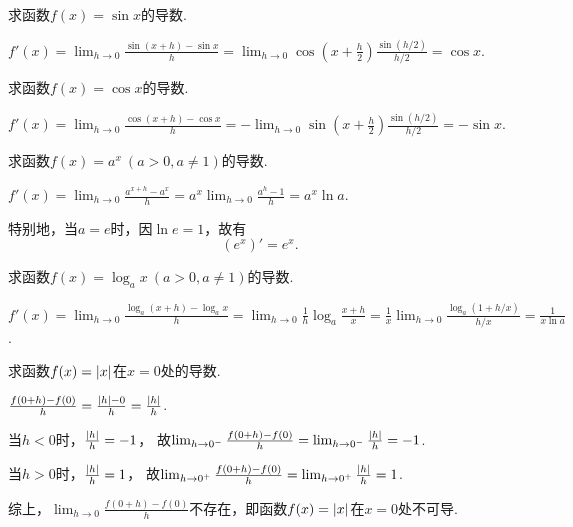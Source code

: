 \begin{example}%
求函数\(f(x) = \sin x\)的导数.
\begin{solution}
\(f'(x) = \lim_{h\to0} \frac{\sin(x+h)-\sin x}{h}
= \lim_{h\to0} \cos(x+\frac{h}{2}) \frac{\sin(h/2)}{h/2}
= \cos x\).
\end{solution}
\end{example}

\begin{example}%
求函数\(f(x) = \cos x\)的导数.
\begin{solution}
\(f'(x) = \lim_{h\to0} \frac{\cos(x+h)-\cos x}{h}
= - \lim_{h\to0} \sin\left(x+\frac{h}2\right) \frac{\sin(h/2)}{h/2}
= - \sin x\).
\end{solution}
\end{example}

\begin{example}%
求函数\(f(x) = a^x\ (a>0,a\neq1)\)的导数.
\begin{solution}
\(f'(x)
= \lim_{h\to0}\frac{a^{x+h}-a^x}{h}
= a^x \lim_{h\to0}\frac{a^h-1}{h}
= a^x \ln a\).
\end{solution}
\end{example}
\begin{remark}
特别地，当\(a=e\)时，因\(\ln e = 1\)，故有\[
	(e^x)' = e^x.
\]
\end{remark}

\begin{example}%
求函数\(f(x) = \log_a x\ (a>0,a\neq1)\)的导数.
\begin{solution}
\(f'(x)
= \lim_{h\to0}\frac{\log_a(x+h)-\log_a x}{h}
= \lim_{h\to0}{\frac{1}{h} \log_a\frac{x+h}{x}}
= \frac{1}{x} \lim_{h\to0}\frac{\log_a(1+h/x)}{h/x}
= \frac{1}{x \ln a}\).
\end{solution}
\end{example}

\begin{example}
求函数\(f(x) = \abs{x}\)在\(x=0\)处的导数.
\begin{solution}
\(\frac{f(0+h)-f(0)}{h} = \frac{\abs{h}-0}{h} = \frac{\abs{h}}{h}\).

当\(h < 0\)时，\(\frac{\abs{h}}{h} = -1\)，
故\(\lim_{h\to0^-}\frac{f(0+h)-f(0)}{h}
= \lim_{h\to0^-}\frac{\abs{h}}{h} = -1\).

当\(h > 0\)时，\(\frac{\abs{h}}{h} = 1\)，
故\(\lim_{h\to0^+}\frac{f(0+h)-f(0)}{h}
= \lim_{h\to0^+}\frac{\abs{h}}{h} = 1\).

综上，\(\lim_{h\to0}\frac{f(0+h)-f(0)}{h}\)不存在，即函数\(f(x) = \abs{x}\)在\(x = 0\)处不可导.
\end{solution}
\end{example}

